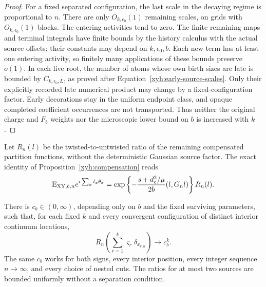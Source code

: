 \begin{proof}
For a fixed separated configuration, the last scale in the decaying
regime is proportional to \(n\).  There are only
\(O_{k,\epsilon_0}(1)\) remaining scales, on grids with
\(O_{k,\epsilon_0}(1)\) blocks.  The entering activities tend to zero.
The finite remaining maps and terminal integrals have finite bounds
by the history calculus with the actual source offsets;
their constants may depend on \(k,\epsilon_0,b\).  Each new term has
at least one entering activity, so finitely many applications of
these bounds preserve \(o(1)\). In each live root, the number of atoms
whose own birth sizes are late is bounded by
\(C_{k,\epsilon_0,L}\), as proved after
Equation~\eqref{xyh:early-source-scales}. Only their explicitly recorded
late numerical product may change by a fixed-configuration factor. Early
decorations stay in the uniform endpoint class, and opaque completed
coefficient occurrences are not transported. Thus neither the original
charge and \(F_b\) weights nor the microscopic lower bound on \(b\)
is increased with \(k\).
\end{proof}

Let \(R_n(l)\) be the twisted-to-untwisted ratio of the remaining
compensated partition functions, without the deterministic Gaussian
source factor.  The exact identity of Proposition~\ref{xyh:compensation}
reads
\begin{equation}
 \mathbb E_{\mathrm{XY},b,n}e^{i\sum_x l_x\theta_x}
  =\exp\left\{-\frac{s+d_c^2/\mu}{2b}(l,G_nl)\right\}R_n(l).
 \label{xyf:spinfactor}
\end{equation}

\begin{proposition}\label{xyf:amplitude}
There is \(c_b\in(0,\infty)\), depending only on \(b\) and the
fixed surviving parameters, such that, for each fixed \(k\) and
every convergent configuration of distinct interior continuum
locations,
\begin{equation}
 R_n\!\left(\sum_{r=1}^k\varsigma_r\delta_{x_{r,n}}\right)
       \longrightarrow c_b^k.
 \label{xyf:amplitudelimit}
\end{equation}
The same \(c_b\) works for both signs, every interior position,
every integer sequence \(n\to\infty\), and every choice of nested
cuts.  The ratios for at most two sources are bounded uniformly
without a separation condition.
\end{proposition}

